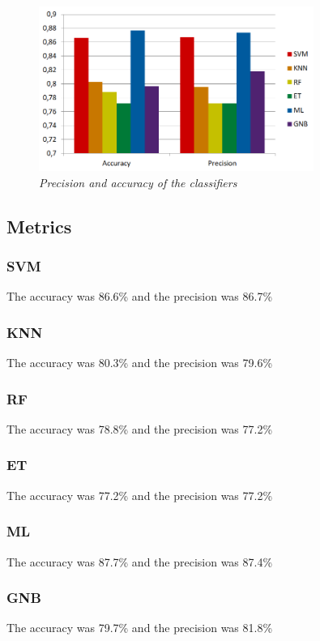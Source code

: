 \documentclass[12pt]{article}
\begin{document}
\begin{figure}[!htb]
	\centering %
	\includegraphics[width=0.8\textwidth]{metrics.png} %
	\caption{\textit{Precision and accuracy of the classifiers}} %
	\label{fig:metrics}
\end{figure}

\subsection{Metrics}
\subsubsection{SVM}
The accuracy was 86.6\% and the precision was 86.7\%
\subsubsection{KNN}
The accuracy was 80.3\% and the precision was 79.6\%
\subsubsection{RF}
The accuracy was 78.8\% and the precision was 77.2\%
\subsubsection{ET}
The accuracy was 77.2\% and the precision was 77.2\%
\subsubsection{ML}
The accuracy was 87.7\% and the precision was 87.4\%
\subsubsection{GNB}
The accuracy was 79.7\% and the precision was 81.8\%
\end{document}
